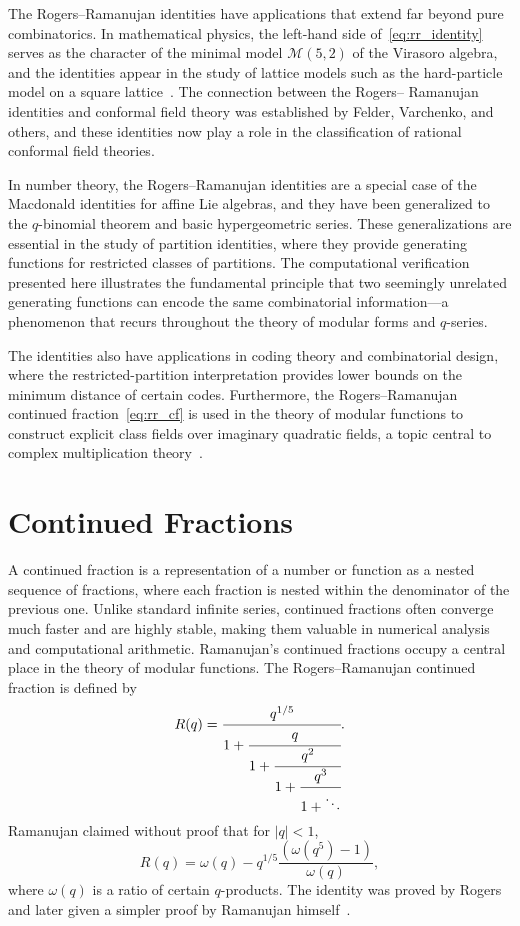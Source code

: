 \documentclass[10pt]{amsart}
\theoremstyle{plain}
\theoremstyle{definition}
\theoremstyle{remark}
\begin{document}
The Rogers--Ramanujan identities have applications that extend far
beyond pure combinatorics. In mathematical physics, the left-hand side
of~\eqref{eq:rr_identity} serves as the character of the minimal model
${\mathcal M}(5,2)$ of the Virasoro algebra, and the identities appear
in the study of lattice models such as the hard-particle model on a
square lattice~\cite{andrews_q}. The connection between the Rogers--
Ramanujan identities and conformal field theory was established by
Felder, Varchenko, and others, and these identities now play a role in
the classification of rational conformal field theories.

In number theory, the Rogers--Ramanujan identities are a special case of
the Macdonald identities for affine Lie algebras, and they have been
generalized to the $q$-binomial theorem and basic hypergeometric series.
These generalizations are essential in the study of partition identities,
where they provide generating functions for restricted classes of
partitions. The computational verification presented here illustrates
the fundamental principle that two seemingly unrelated generating
functions can encode the same combinatorial information---a phenomenon
that recurs throughout the theory of modular forms and $q$-series.

The identities also have applications in coding theory and
combinatorial design, where the restricted-partition interpretation
provides lower bounds on the minimum distance of certain codes.
Furthermore, the Rogers--Ramanujan continued fraction~\eqref{eq:rr_cf}
is used in the theory of modular functions to construct explicit
class fields over imaginary quadratic fields, a topic central to
complex multiplication theory~\cite{shimura_ct}.

\section{Continued Fractions}
\label{sec:cf}

A continued fraction is a representation of a number or function as a nested sequence of fractions, where each fraction is nested within the denominator of the previous one. Unlike standard infinite series, continued fractions often converge much faster and are highly stable, making them valuable in numerical analysis and computational arithmetic. Ramanujan's continued fractions occupy a central place in the theory of modular functions. The Rogers--Ramanujan continued fraction is defined by
\begin{equation}
\label{eq:rr_cf}
R(q) = \cfrac{q^{1/5}}{1 + \cfrac{q}{1 + \cfrac{q^2}{1 +
\cfrac{q^3}{1 + \ddots}}}}.
\end{equation}
Ramanujan claimed without proof that for $|q| < 1$,
\begin{equation}
\label{eq:rr_cf_relation}
R(q) = \omega(q) - q^{1/5} \frac{(\omega(q^5)-1)}{\omega(q)},
\end{equation}
where $\omega(q)$ is a ratio of certain $q$-products. The identity
was proved by Rogers~\cite{rogers_1894} and later given a simpler
proof by Ramanujan himself~\cite{ramanujan_notebooks}.
\end{document}
